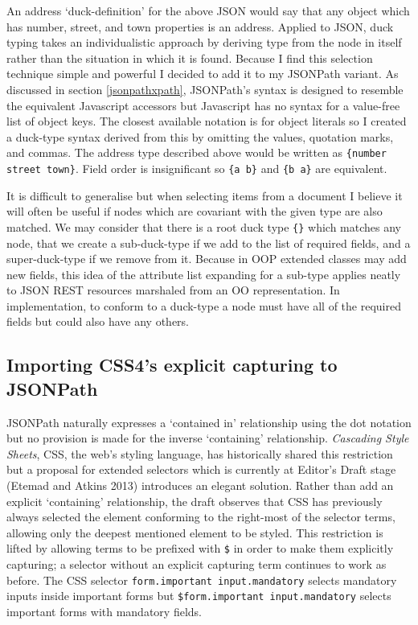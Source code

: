 \documentclass[12pt, ]{article}
\begin{document}
An address `duck-definition' for the above JSON would say that any
object which has number, street, and town properties is an address.
Applied to JSON, duck typing takes an individualistic approach by
deriving type from the node in itself rather than the situation in which
it is found. Because I find this selection technique simple and powerful
I decided to add it to my JSONPath variant. As discussed in section
\ref{jsonpathxpath}, JSONPath's syntax is designed to resemble the
equivalent Javascript accessors but Javascript has no syntax for a
value-free list of object keys. The closest available notation is for
object literals so I created a duck-type syntax derived from this by
omitting the values, quotation marks, and commas. The address type
described above would be written as \texttt{\{number street town\}}.
Field order is insignificant so \texttt{\{a b\}} and \texttt{\{b a\}}
are equivalent.

It is difficult to generalise but when selecting items from a document I
believe it will often be useful if nodes which are covariant with the
given type are also matched. We may consider that there is a root duck
type \texttt{\{\}} which matches any node, that we create a
sub-duck-type if we add to the list of required fields, and a
super-duck-type if we remove from it. Because in OOP extended classes
may add new fields, this idea of the attribute list expanding for a
sub-type applies neatly to JSON REST resources marshaled from an OO
representation. In implementation, to conform to a duck-type a node must
have all of the required fields but could also have any others.

\subsection{Importing CSS4's explicit capturing to
JSONPath}\label{importing-css4s-explicit-capturing-to-jsonpath}

JSONPath naturally expresses a `contained in' relationship using the dot
notation but no provision is made for the inverse `containing'
relationship. \emph{Cascading Style Sheets}, CSS, the web's styling
language, has historically shared this restriction but a proposal for
extended selectors which is currently at Editor's Draft stage (Etemad
and Atkins 2013) introduces an elegant solution. Rather than add an
explicit `containing' relationship, the draft observes that CSS has
previously always selected the element conforming to the right-most of
the selector terms, allowing only the deepest mentioned element to be
styled. This restriction is lifted by allowing terms to be prefixed with
\texttt{\$} in order to make them explicitly capturing; a selector
without an explicit capturing term continues to work as before. The CSS
selector \texttt{form.important input.mandatory} selects mandatory
inputs inside important forms but
\texttt{\$form.important input.mandatory} selects important forms with
mandatory fields.
\end{document}
